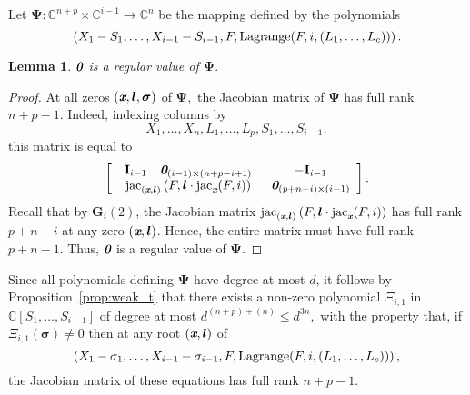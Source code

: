 \documentclass[a4paper]{article}
\def\bz{\textit{\textbf{0}}}
\def\lb{{\bm l}}
\def\xb{\textit{\textbf{x}}}
\def\bI{\textbf{I}}
\DeclareMathOperator{\jac}{jac}
\DeclareMathOperator{\lag}{Lagrange}
\def\C{\mathbb{C}}
\def\lagF{{\bm\lag}(F,i,(L_1,\hdots,L_c))}
\newtheorem{lemma}[theorem]{Lemma}
\begin{document}
\smallskip

Let $\bm\Psi: \C^{n+p} \times \C^{i-1} \rightarrow \C^{n}$ be the mapping defined by the polynomials
\[
  \left(X_1-S_1,\dots,X_{i-1}-S_{i-1},F,\lagF\right).
\]
%
\begin{lemma}
  $\bz$ is a regular value of $\bm\Psi.$
\end{lemma}
\begin{proof}
At all zeros $(\xb,\lb,\bm \sigma)$ of $\bm\Psi,$ the Jacobian matrix of
$\bm\Psi$ has full rank $n+p-1$. Indeed, indexing columns 
    by 
    \[
    X_1,\dots,X_n,L_1,\hdots,L_p,S_1,\dots,S_{i-1},
    \]
    this matrix is equal to
    \[
    \left[ 
    \begin{array}{cc}
    \begin{array}{cc}
    \bI_{i-1}     & \bz_{(i-1)\times (n+p-i+1)}  
    \end{array}  &-\bI_{i-1}\\
    \jac_{(\xb,\bm l)}\left( F,\lb \cdot \jac_{\xb} (F,i)  \right) & \bz_{(p+n-i)\times (i-1)}
    \end{array}
    \right].
    \]
    Recall that by $\bm G_i(2)$, the Jacobian matrix $\jac_{(\xb,\bm l)}\left( F,\lb \cdot \jac_{\xb} (F,i) \right)$ has full rank $p+n-i$ at any zero $(\xb,\bm l)$. Hence, the entire    
    matrix must have full rank $p+n-1$. Thus,  $\bz$ is a regular value of $\bm\Psi.$
    \end{proof}

Since all polynomials defining $\bm\Psi$ have degree at most $d$, it
follows by Proposition~\ref{prop:weak_t} that there exists a non-zero
polynomial $\Xi_{i,1}$ in $\C[S_1,\dots,S_{i-1}]$ of degree at most
$d^{(n+p)+(n)}\leq d^{3n},$ with the property that, if $\Xi_{i,1}(\bm \sigma)\neq 0$ then at any root $(\xb,\lb)$ of
\[
\left(X_1-\sigma_1,\dots,X_{i-1}-\sigma_{i-1},F,\lagF\right),
\] 
  the Jacobian matrix of these
equations has full rank $n+p-1$. 
\end{document}
